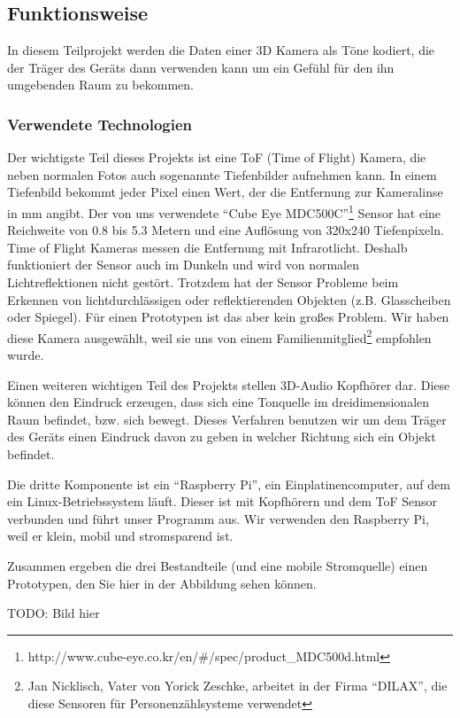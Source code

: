 \documentclass[a4paper,12pt,ngerman]{scrartcl}
\begin{document}
\subsection{Funktionsweise}

In diesem Teilprojekt werden die Daten einer 3D Kamera als Töne kodiert, die der Träger des Geräts
dann verwenden kann um ein Gefühl für den ihn umgebenden Raum zu bekommen. 

\subsubsection{Verwendete Technologien}

Der wichtigste Teil dieses Projekts ist eine ToF (Time of Flight) Kamera, die neben normalen Fotos 
auch sogenannte Tiefenbilder aufnehmen kann.
In einem Tiefenbild bekommt jeder Pixel einen Wert, der die Entfernung zur Kameralinse in mm angibt.
Der von uns verwendete \enquote{Cube Eye MDC500C}\footnote{http://www.cube-eye.co.kr/en/\#/spec/product\_MDC500d.html}
Sensor hat eine Reichweite von 0.8 bis 5.3 Metern und eine Auflösung von 320x240 Tiefenpixeln. 
Time of Flight Kameras messen die Entfernung mit Infrarotlicht. Deshalb funktioniert der Sensor auch 
im Dunkeln und wird von normalen Lichtreflektionen nicht gestört. Trotzdem hat der Sensor Probleme beim
Erkennen von lichtdurchlässigen oder reflektierenden Objekten (z.B. Glasscheiben oder Spiegel). Für einen
Prototypen ist das aber kein großes Problem. Wir haben diese Kamera ausgewählt, weil sie uns von einem 
Familienmitglied\footnote{Jan Nicklisch, Vater von Yorick Zeschke, arbeitet in der Firma
	\enquote{DILAX}, die diese Sensoren für Personenzählsysteme verwendet} 
empfohlen wurde.\par
Einen weiteren wichtigen Teil des Projekts stellen 3D-Audio Kopfhörer dar. Diese können den Eindruck
erzeugen, dass sich eine Tonquelle im dreidimensionalen
Raum befindet, bzw. sich bewegt. Dieses Verfahren benutzen wir um dem Träger des Geräts einen Eindruck
davon zu geben in welcher Richtung sich ein Objekt befindet.\par 
Die dritte Komponente ist ein \enquote{Raspberry Pi}, ein 
Einplatinencomputer, auf dem ein Linux-Betriebssystem läuft. Dieser ist mit Kopfhörern und dem ToF Sensor 
verbunden und führt unser Programm aus. Wir verwenden den Raspberry Pi, weil er klein, mobil und 
stromsparend ist.\par 
Zusammen ergeben die drei Bestandteile (und eine mobile Stromquelle) einen Prototypen, den Sie hier 
in der Abbildung sehen können.
\par 
TODO: Bild hier 
\end{document}
